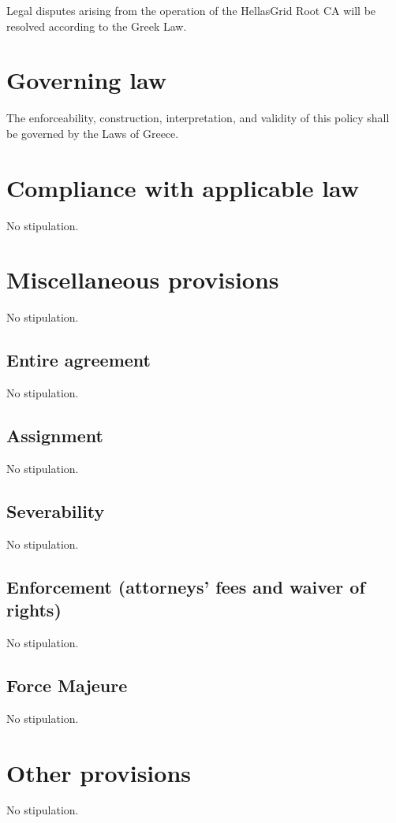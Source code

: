\documentclass[11pt,a4paper,titlepage]{book}
\begin{document}
Legal disputes arising from the operation of the HellasGrid Root CA will be resolved according to the Greek Law.

\section{Governing law}

The enforceability, construction, interpretation, and validity of this policy shall be governed by the Laws of Greece.


\section{Compliance with applicable law}

No stipulation.

\section{Miscellaneous provisions}

No stipulation.

\subsection{Entire agreement}

No stipulation.

\subsection{Assignment}

No stipulation.

\subsection{Severability}

No stipulation.


\subsection{Enforcement (attorneys' fees and waiver of rights)}

No stipulation.

\subsection{Force Majeure}

No stipulation.

\section{Other provisions}

No stipulation.
\end{document}
